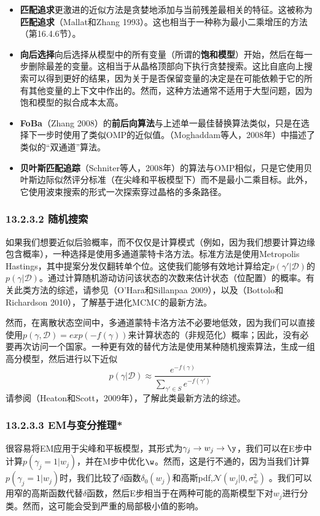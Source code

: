 \documentclass[a4paper]{article}
\begin{document}
\begin{itemize}
\item \textbf{匹配追求}更激进的近似方法是贪婪地添加与当前残差最相关的特征。这被称为\textbf{匹配追求}（Mallat和Zhang 1993）。这也相当于一种称为最小二乘增压的方法（第16.4.6节）。
\item \textbf{向后选择}向后选择从模型中的所有变量（所谓的\textbf{饱和模型}）开始，然后在每一步删除最差的变量。这相当于从晶格顶部向下执行贪婪搜索。这比自底向上搜索可以得到更好的结果，因为关于是否保留变量的决定是在可能依赖于它的所有其他变量的上下文中作出的。然而，这种方法通常不适用于大型问题，因为饱和模型的拟合成本太高。 
\item \textbf{FoBa}（Zhang 2008）的\textbf{前后向算法}与上述单一最佳替换算法类似，只是在选择下一步时使用了类似OMP的近似值。（Moghaddam等人，2008年）中描述了类似的“双通道”算法。
\item \textbf{贝叶斯匹配追踪}（Schniter等人，2008年）的算法与OMP相似，只是它使用贝叶斯边际似然评分标准（在尖峰和平板模型下）而不是最小二乘目标。此外，它使用波束搜索的形式一次探索穿过晶格的多条路径。 
\end{itemize}

\subsubsection*{13.2.3.2   随机搜索 }
如果我们想要近似后验概率，而不仅仅是计算模式（例如，因为我们想要计算边缘包含概率），一种选择是使用多通道蒙特卡洛方法。标准方法是使用Metropolis Hastings，其中提案分发仅翻转单个位。这使我们能够有效地计算给定$p(\gamma'|\mathcal{D})$的$p(\gamma|\mathcal{D})$。通过计算随机游动访问该状态的次数来估计状态（位配置）的概率。有关此类方法的综述，请参见（O'Hara和Sillanpaa 2009），以及（Bottolo和Richardson 2010），了解基于进化MCMC的最新方法。 

然而，在离散状态空间中，多通道蒙特卡洛方法不必要地低效，因为我们可以直接使用$p(\gamma,\mathcal{D})=exp(-f(\gamma))$来计算状态的（非规范化）概率；因此，没有必要再次访问一个国家。一种更有效的替代方法是使用某种随机搜索算法，生成一组高分模型，然后进行以下近似 
\begin{equation}
	p(\gamma|\mathcal{D})\approx \dfrac{e^{-f(\gamma)}}{\sum\nolimits_{\gamma'\in S}e^{-f(\gamma')}}\tag{13.31}
\end{equation}
请参阅（Heaton和Scott，2009年），了解此类最新方法的综述。 

\subsubsection*{13.2.3.3  EM与变分推理* }
很容易将EM应用于尖峰和平板模型，其形式为$\gamma_j\to w_j\to \y$，我们可以在E步中计算$p(\gamma_j=1|w_j)$，并在M步中优化$\w$。然而，这是行不通的，因为当我们计算$p(\gamma_j=1|w_j)$时，我们比较了$\delta$函数$\delta_0(w_j)$和高斯pdf,$\mathcal{N}(w_j|0,\sigma_w^2)$ 。我们可以用窄的高斯函数代替$\delta$函数，然后E步相当于在两种可能的高斯模型下对$w_j$进行分类。然而，这可能会受到严重的局部极小值的影响。 
\end{document}
